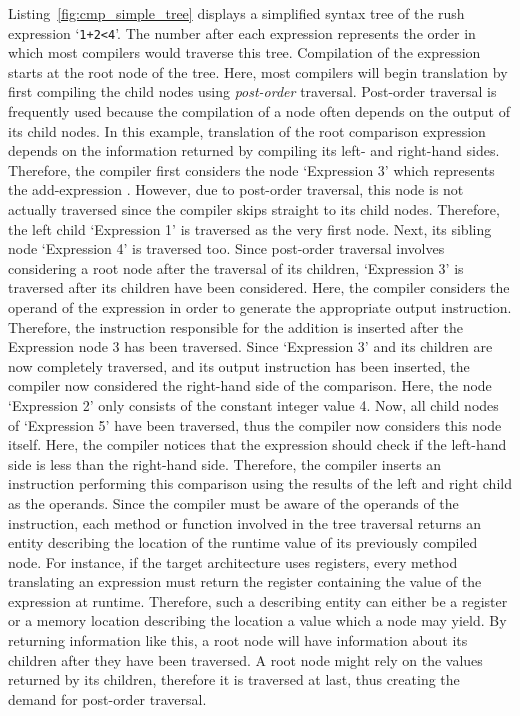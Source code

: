 Listing~\ref{fig:cmp_simple_tree} displays a simplified syntax tree of the rush expression `\texttt{1+2<4}'.
The number after each expression represents the order in which most compilers would traverse this tree.
Compilation of the expression starts at the root node of the tree.
Here, most compilers will begin translation by first compiling the child nodes using \emph{post-order} traversal.
Post-order traversal is frequently used because the compilation of a node often depends on the output of its child nodes.
In this example, translation of the root comparison expression depends on the information returned by compiling its left- and right-hand sides.
Therefore, the compiler first considers the node `Expression 3' which represents the add-expression .
However, due to post-order traversal, this node is not actually traversed since the compiler skips straight to its child nodes.
Therefore, the left child `Expression 1' is traversed as the very first node.
Next, its sibling node `Expression 4' is traversed too.
Since post-order traversal involves considering a root node after the traversal of its children, `Expression 3' is traversed after its children have been considered.
Here, the compiler considers the operand of the expression in order to generate the appropriate output instruction.
Therefore, the instruction responsible for the addition is inserted after the Expression node 3 has been traversed.
Since `Expression 3' and its children are now completely traversed, and its output instruction has been inserted, the compiler now considered the right-hand side of the comparison.
Here, the node `Expression 2' only consists of the constant integer value 4.
Now, all child nodes of `Expression 5' have been traversed, thus the compiler now considers this node itself.
Here, the compiler notices that the expression should check if the left-hand side is less than the right-hand side.
Therefore, the compiler inserts an instruction performing this comparison using the results of the left and right child as the operands.
Since the compiler must be aware of the operands of the instruction, each method or function involved in the tree traversal returns an entity describing the location of the runtime value of its previously compiled node.
For instance, if the target architecture uses registers, every method translating an expression must return the register containing the value of the expression at runtime.
Therefore, such a describing entity can either be a register or a memory location describing the location a value which a node may yield.
By returning information like this, a root node will have information about its children after they have been traversed.
A root node might rely on the values returned by its children, therefore it is traversed at last, thus creating the demand for post-order traversal.

